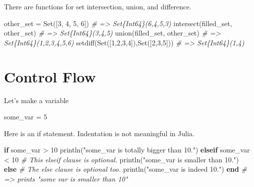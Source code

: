 \documentclass[ignorenonframetext,]{beamer}
\newenvironment{Shaded}{}{}
\newcommand{\KeywordTok}[1]{\textcolor[rgb]{0.00,0.44,0.13}{\textbf{{#1}}}}
\newcommand{\DataTypeTok}[1]{\textcolor[rgb]{0.56,0.13,0.00}{{#1}}}
\newcommand{\FloatTok}[1]{\textcolor[rgb]{0.25,0.63,0.44}{{#1}}}
\newcommand{\StringTok}[1]{\textcolor[rgb]{0.25,0.44,0.63}{{#1}}}
\newcommand{\CommentTok}[1]{\textcolor[rgb]{0.38,0.63,0.69}{\textit{{#1}}}}
\newcommand{\NormalTok}[1]{{#1}}
\begin{document}
\begin{frame}[fragile]{There are functions for set intersection, union,
and difference.}

\begin{Shaded}
\begin{Highlighting}[]
\NormalTok{other_set = }\DataTypeTok{Set}\NormalTok{([}\FloatTok{3}\NormalTok{, }\FloatTok{4}\NormalTok{, }\FloatTok{5}\NormalTok{, }\FloatTok{6}\NormalTok{]) }\CommentTok{# => Set\{Int64\}(6,4,5,3)}
\NormalTok{intersect(filled_set, other_set) }\CommentTok{# => Set\{Int64\}(3,4,5)}
\NormalTok{union(filled_set, other_set) }\CommentTok{# => Set\{Int64\}(1,2,3,4,5,6)}
\NormalTok{setdiff(}\DataTypeTok{Set}\NormalTok{([}\FloatTok{1}\NormalTok{,}\FloatTok{2}\NormalTok{,}\FloatTok{3}\NormalTok{,}\FloatTok{4}\NormalTok{]),}\DataTypeTok{Set}\NormalTok{([}\FloatTok{2}\NormalTok{,}\FloatTok{3}\NormalTok{,}\FloatTok{5}\NormalTok{])) }\CommentTok{# => Set\{Int64\}(1,4)}
\end{Highlighting}
\end{Shaded}

\end{frame}

\section{Control Flow}\label{control-flow}

\begin{frame}[fragile]{Let's make a variable}

\begin{Shaded}
\begin{Highlighting}[]
\NormalTok{some_var = }\FloatTok{5}
\end{Highlighting}
\end{Shaded}

\end{frame}

\begin{frame}[fragile]{Here is an if statement. Indentation is not
meaningful in Julia.}

\begin{Shaded}
\begin{Highlighting}[]
\KeywordTok{if} \NormalTok{some_var > }\FloatTok{10}
    \NormalTok{println(}\StringTok{"some_var is totally bigger than 10."}\NormalTok{)}
\KeywordTok{elseif} \NormalTok{some_var < }\FloatTok{10}    \CommentTok{# This elseif clause is optional.}
    \NormalTok{println(}\StringTok{"some_var is smaller than 10."}\NormalTok{)}
\KeywordTok{else}                    \CommentTok{# The else clause is optional too.}
    \NormalTok{println(}\StringTok{"some_var is indeed 10."}\NormalTok{)}
\KeywordTok{end}
\CommentTok{# => prints "some var is smaller than 10"}
\end{Highlighting}
\end{Shaded}

\end{frame}
\end{document}
